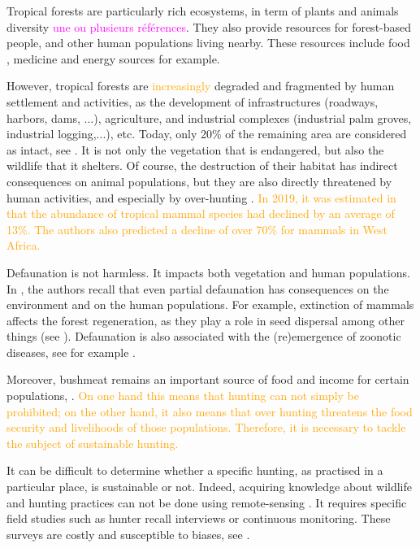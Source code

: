 \documentclass{article}
\newcommand{\YD}[1]{\textcolor{magenta}{#1}}
\newcommand{\vdeux}[1]{\textcolor{orange}{#1}}
\theoremstyle{definition}
\theoremstyle{remark}
\begin{document}
Tropical forests are particularly rich ecosystems, in term of plants and animals diversity \YD{une ou plusieurs  références}. They also provide resources for forest-based people, and other human populations living nearby. These resources include food \cite{avila_martin_food_2024}, medicine
and energy sources \cite{mangula_energy_2019} for example.

However, tropical forests are \vdeux{increasingly} degraded and fragmented by human settlement and activities, as the development of infrastructures (roadways, harbors, dams, ...), agriculture, and industrial complexes (industrial palm groves, industrial logging,...), etc. 
Today, only 20\% of the remaining area are considered as intact, see \cite{benitez-lopez_intact_2019}. It is not only the vegetation that is endangered, but also the wildlife that it shelters. Of course, the destruction of their habitat has indirect consequences on animal populations, but they are also directly threatened by human activities, and especially by over-hunting \cite{benitez-lopez_intact_2019, wilkie_empty_2011}. \vdeux{In 2019, it was estimated in \cite{benitez-lopez_intact_2019}that the abundance of tropical mammal species had declined by an average of 13\%. The authors also predicted a decline of over 70\% for mammals in West Africa. }

Defaunation is not harmless. It impacts both vegetation and human populations. In \cite{ripple_bushmeat_2016}, the authors recall that even partial defaunation has consequences on the environment and on the human populations. For example, extinction of mammals affects the forest regeneration, as they play a role in seed dispersal among other things (see \cite{peres_dispersal_2016, wright_bushmeat_2007}). Defaunation is also associated with the (re)emergence of zoonotic diseases, see for example \cite{dobigny_zoonotic_2022, white_emerging_2020}. 

Moreover, bushmeat remains an important source of food and income for certain populations, \cite{jones_incentives_2019}. 
\vdeux{
On one hand this means that hunting can not simply be prohibited; on the other hand, it also means that over hunting threatens the food security and livelihoods of those populations. Therefore, it is necessary to tackle the subject of sustainable hunting.
}

It can be difficult to determine whether a specific hunting, as practised in a particular place, is sustainable or not. Indeed, acquiring knowledge about wildlife and hunting practices can not be done using remote-sensing \cite{peres_detecting_2006}. It requires specific field studies such as hunter recall interviews or continuous monitoring. These surveys are costly and susceptible to biases, see \cite{jones_consequences_2020}.
\end{document}
